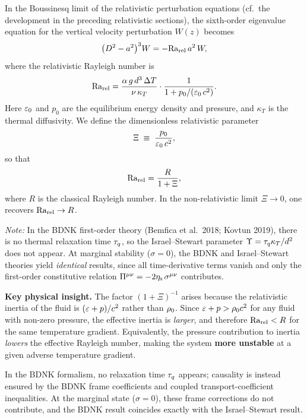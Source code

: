 In the Boussinesq limit of the relativistic perturbation equations
(cf.\ the development in the preceding relativistic sections), the
sixth-order eigenvalue equation for the vertical velocity perturbation
$W(z)$ becomes
\begin{equation}
\label{eq:rel-15-eigen}
\bigl(D^{2}-a^{2}\bigr)^{3}W = -\mathrm{Ra}_{\mathrm{rel}}\,a^{2}\,W,
\end{equation}
where the relativistic Rayleigh number is
\begin{equation}
\label{eq:rel-15-Radef}
\mathrm{Ra}_{\mathrm{rel}} = \frac{\alpha\,g\,d^{3}\,\Delta T}{\nu\,\kappa_{T}}
  \cdot\frac{1}{1 + p_{0}/(\varepsilon_{0}\,c^{2})}.
\end{equation}
Here $\varepsilon_{0}$ and $p_{0}$ are the equilibrium energy density
and pressure, and $\kappa_{T}$ is the thermal diffusivity. We define
the dimensionless relativistic parameter
\begin{equation}
\label{eq:rel-15-params}
\Xi \;\equiv\; \frac{p_{0}}{\varepsilon_{0}\,c^{2}},
\end{equation}
so that
\begin{equation}
\label{eq:rel-15-Rarel}
\mathrm{Ra}_{\mathrm{rel}} = \frac{R}{1+\Xi},
\end{equation}
where $R$ is the classical Rayleigh number. In the non-relativistic
limit $\Xi \to 0$, one recovers $\mathrm{Ra}_{\mathrm{rel}} \to R$.

\emph{Note:} In the BDNK first-order theory (Bemfica et al.\ 2018;
Kovtun 2019), there is no thermal relaxation time $\tau_{q}$, so the
Israel--Stewart parameter $\Upsilon = \tau_{q}\kappa_T/d^2$ does not
appear.  At marginal stability ($\sigma = 0$), the BDNK and
Israel--Stewart theories yield \emph{identical} results, since all
time-derivative terms vanish and only the first-order constitutive
relation $\Pi^{\mu\nu} = -2\eta_{\mathrm{s}}\,\sigma^{\mu\nu}$ contributes.

\begin{relcorrection}
\textbf{Key physical insight.}
The factor $(1+\Xi)^{-1}$ arises because the relativistic inertia of
the fluid is $(\varepsilon + p)/c^{2}$ rather than $\rho_0$. Since
$\varepsilon + p > \rho_0 c^{2}$ for any fluid with non-zero pressure,
the effective inertia is \emph{larger}, and therefore $\mathrm{Ra}_{\mathrm{rel}} < R$ for
the same temperature gradient. Equivalently, the pressure contribution
to inertia \emph{lowers} the effective Rayleigh number, making the
system \textbf{more unstable} at a given adverse temperature gradient.

In the BDNK formalism, no relaxation time $\tau_{q}$ appears; causality
is instead ensured by the BDNK frame coefficients and coupled
transport-coefficient inequalities.  At the marginal state
($\sigma = 0$), these frame corrections do not contribute, and the
BDNK result coincides exactly with the Israel--Stewart result.
\end{relcorrection}

